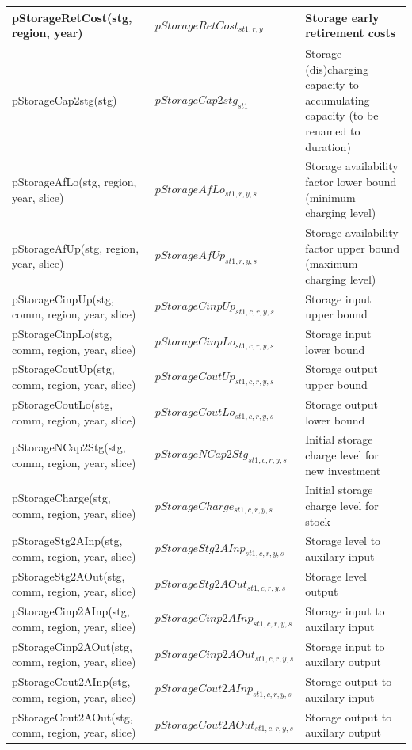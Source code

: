 \documentclass{article}
\begin{document}
\begin{longtable}{|p{10cm}|p{5cm}|p{9cm}|}
 \hline
pStorageRetCost(stg, region, year) & $pStorageRetCost_{st1,r,y}$ & Storage early retirement costs \\ 
 \hline
pStorageCap2stg(stg) & $pStorageCap2stg_{st1}$ & Storage (dis)charging capacity to accumulating capacity (to be renamed to duration) \\ 
 \hline
pStorageAfLo(stg, region, year, slice) & $pStorageAfLo_{st1,r,y,s}$ & Storage availability factor lower bound (minimum charging level) \\ 
 \hline
pStorageAfUp(stg, region, year, slice) & $pStorageAfUp_{st1,r,y,s}$ & Storage availability factor upper bound (maximum charging level) \\ 
 \hline
pStorageCinpUp(stg, comm, region, year, slice) & $pStorageCinpUp_{st1,c,r,y,s}$ & Storage input upper bound \\ 
 \hline
pStorageCinpLo(stg, comm, region, year, slice) & $pStorageCinpLo_{st1,c,r,y,s}$ & Storage input lower bound \\ 
 \hline
pStorageCoutUp(stg, comm, region, year, slice) & $pStorageCoutUp_{st1,c,r,y,s}$ & Storage output upper bound \\ 
 \hline
pStorageCoutLo(stg, comm, region, year, slice) & $pStorageCoutLo_{st1,c,r,y,s}$ & Storage output lower bound \\ 
 \hline
pStorageNCap2Stg(stg, comm, region, year, slice) & $pStorageNCap2Stg_{st1,c,r,y,s}$ & Initial storage charge level for new investment \\ 
 \hline
pStorageCharge(stg, comm, region, year, slice) & $pStorageCharge_{st1,c,r,y,s}$ & Initial storage charge level for stock \\ 
 \hline
pStorageStg2AInp(stg, comm, region, year, slice) & $pStorageStg2AInp_{st1,c,r,y,s}$ & Storage level to auxilary input \\ 
 \hline
pStorageStg2AOut(stg, comm, region, year, slice) & $pStorageStg2AOut_{st1,c,r,y,s}$ & Storage level output \\ 
 \hline
pStorageCinp2AInp(stg, comm, region, year, slice) & $pStorageCinp2AInp_{st1,c,r,y,s}$ & Storage input to auxilary input \\ 
 \hline
pStorageCinp2AOut(stg, comm, region, year, slice) & $pStorageCinp2AOut_{st1,c,r,y,s}$ & Storage input to auxilary output \\ 
 \hline
pStorageCout2AInp(stg, comm, region, year, slice) & $pStorageCout2AInp_{st1,c,r,y,s}$ & Storage output to auxilary input \\ 
 \hline
pStorageCout2AOut(stg, comm, region, year, slice) & $pStorageCout2AOut_{st1,c,r,y,s}$ & Storage output to auxilary output \\ 

\end{longtable}
\end{document}

